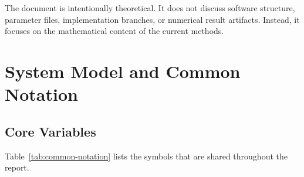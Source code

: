 \documentclass[11pt]{article}
\begin{document}
The document is intentionally theoretical. It does not discuss software
structure, parameter files, implementation branches, or numerical result
artifacts. Instead, it focuses on the mathematical content of the current
methods.

\section{System Model and Common Notation}

\subsection{Core Variables}

Table~\ref{tab:common-notation} lists the symbols that are shared throughout
the report.
\end{document}
